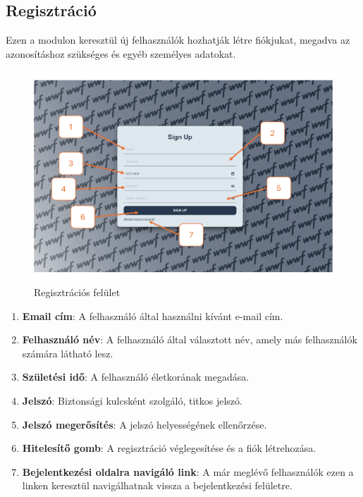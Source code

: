 \subsection{Regisztr\'aci\'o}
Ezen a modulon keresztül új felhasználók hozhatják létre fiókjukat, megadva az azonosításhoz szükséges és egyéb személyes adatokat.
\begin{figure}[H]
    \centering
    \includegraphics[width=14.0truecm]{images/register.pdf}
    \caption{Regisztrációs felület}
    \label{fig:login}
\end{figure}
\begin{enumerate}
  \item \textbf{Email cím}: A felhasználó által használni kívánt e-mail cím.
  \item \textbf{Felhasználó név}: A felhasználó által választott név, amely más felhasználók számára látható lesz.
  \item \textbf{Születési idő}: A felhasználó életkorának megadása.
  \item \textbf{Jelszó}: Biztonsági kulcsként szolgáló, titkos jelszó.
  \item \textbf{Jelszó megerősítés}: A jelszó helyességének ellenőrzése.
  \item \textbf{Hitelesítő gomb}: A regisztráció véglegesítése és a fiók létrehozása.
  \item \textbf{Bejelentkezési oldalra navigáló link}: A már meglévő felhasználók ezen a linken keresztül navigálhatnak vissza a bejelentkezési felületre.
\end{enumerate}
